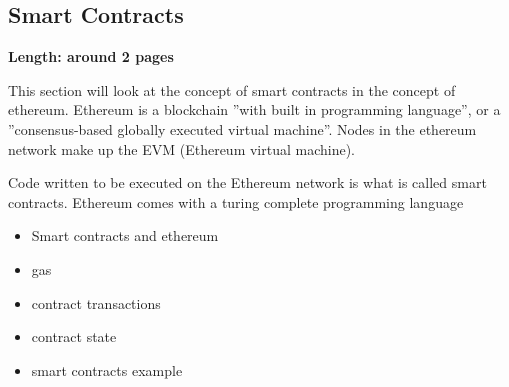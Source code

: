 \subsection{Smart Contracts}
\label{subsec:02_smart_contracts}

\textbf{Length: around 2 pages}

This section will look at the concept of smart contracts in the concept of ethereum.
Ethereum is a blockchain ''with built in programming language'', or a ''consensus-based globally executed virtual machine''. Nodes in the ethereum network make up the EVM (Ethereum virtual machine).

Code written to be executed on the Ethereum network is what is called smart contracts.
Ethereum comes with a turing complete programming language

\begin{itemize}
  \item Smart contracts and ethereum
  \item gas
  \item contract transactions
  \item contract state
  \item smart contracts example
\end{itemize}
